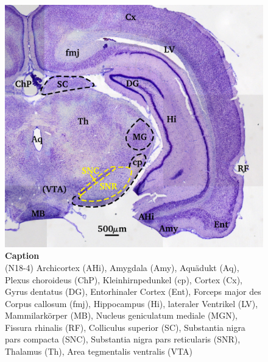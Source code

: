 \documentclass[12pt,a4paper,pdftex]{article}
\begin{document}
\begin{figure}[H]
    \centering
    \includegraphics{pictures/Basalganglia/SN.png}
    \caption[Caption]{\textbf{Caption}\\
    (N18-4)
    Archicortex (AHi), Amygdala (Amy), Aquädukt (Aq), Plexus choroideus (ChP), Kleinhirnpedunkel (cp), Cortex (Cx), Gyrus dentatus (DG), Entorhinaler Cortex (Ent), Forceps major des Corpus callosum (fmj), Hippocampus (Hi), lateraler Ventrikel (LV), Mammilarkörper (MB), Nucleus geniculatum mediale (MGN), Fissura rhinalis (RF), Colliculus superior (SC), Substantia nigra pars compacta (SNC), Substantia nigra pars reticularis (SNR), Thalamus (Th), Area tegmentalis ventralis (VTA)}
    \label{fig:SN_Basalganglia}
\end{figure}
\end{document}
